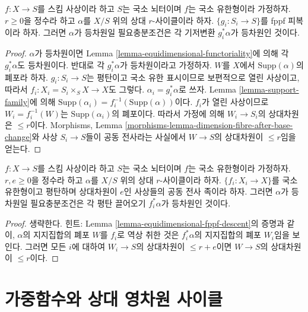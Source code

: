 \begin{lemma}
\label{lemma-equidimensional-fppf-descent}
$f : X \to S$를 스킴 사상이라 하고 $S$는 국소 뇌터이며 $f$는
국소 유한형이라 가정하자. $r \geq 0$을 정수라 하고 $\alpha$를
$X/S$ 위의 상대 $r$-사이클이라 하자. $\{g_i : S_i \to S\}$를
fppf 피복이라 하자. 그러면 $\alpha$가 등차원일 필요충분조건은
각 기저변환 $g_i^*\alpha$가 등차원인 것이다.
\end{lemma}

\begin{proof}
$\alpha$가 등차원이면 Lemma
\ref{lemma-equidimensional-functoriality}에 의해 각 $g_i^*\alpha$도
등차원이다. 반대로 각 $g_i^*\alpha$가 등차원이라고 가정하자.
$W$를 $X$에서 $\text{Supp}(\alpha)$의 폐포라 하자.
$g_i : S_i \to S$는 평탄이고 국소 유한 표시이므로 보편적으로
열린 사상이고, 따라서 $f_i : X_i = S_i \times_S X \to X$도 그렇다.
$\alpha_i = g_i^*\alpha$로 쓰자. Lemma \ref{lemma-support-family}에 의해
$\text{Supp}(\alpha_i) = f_i^{-1}(\text{Supp}(\alpha))$이다.
$f_i$가 열린 사상이므로 $W_i = f_i^{-1}(W)$는
$\text{Supp}(\alpha_i)$의 폐포이다. 따라서 가정에 의해
$W_i \to S_i$의 상대차원은 $\leq r$이다. Morphisms, Lemma
\ref{morphisms-lemma-dimension-fibre-after-base-change}와 사상
$S_i \to S$들이 공동 전사라는 사실에서 $W \to S$의 상대차원이
$\leq r$임을 얻는다.
\end{proof}

\begin{lemma}
\label{lemma-equidimensional-descent-pullbacks}
$f : X \to S$를 스킴 사상이라 하고 $S$는 국소 뇌터이며 $f$는
국소 유한형이라 가정하자. $r, e \geq 0$을 정수라 하고 $\alpha$를
$X/S$ 위의 상대 $r$-사이클이라 하자. $\{f_i : X_i \to X\}$를
국소 유한형이고 평탄하며 상대차원이 $e$인 사상들의 공동 전사
족이라 하자. 그러면 $\alpha$가 등차원일 필요충분조건은 각 평탄
끌어오기 $f_i^*\alpha$가 등차원인 것이다.
\end{lemma}

\begin{proof}
생략한다. 힌트: Lemma \ref{lemma-equidimensional-fppf-descent}의 증명과
같이, $\alpha$의 지지집합의 폐포 $W$를 $f_i$로 역상 취한 것은
$f_i^*\alpha$의 지지집합의 폐포 $W_i$임을 보인다. 그러면 모든
$i$에 대하여 $W_i \to S$의 상대차원이 $\leq r + e$이면
$W \to S$의 상대차원이 $\leq r$이다.
\end{proof}



\section{가중함수와 상대 영차원 사이클}
\label{section-weightings}

